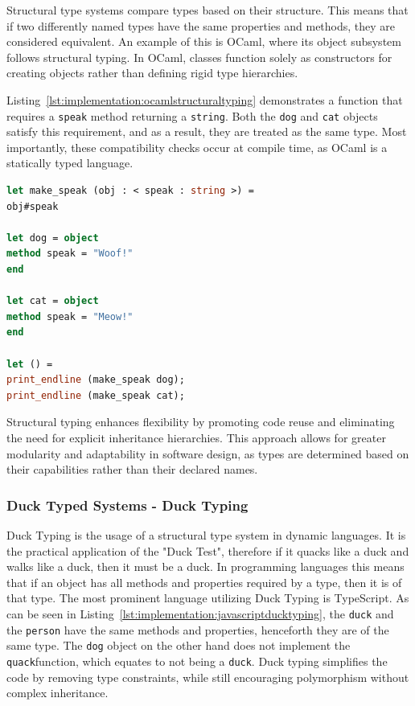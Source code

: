 Structural type systems compare types based on their structure. This means that if two differently named types have the same properties and methods, they are considered equivalent. An example of this is OCaml, where its object subsystem follows structural typing. In OCaml, classes function solely as constructors for creating objects rather than defining rigid type hierarchies.

Listing~\ref{lst:implementation:ocamlstructuraltyping} demonstrates a function that requires a \lstinline|speak| method returning a \lstinline|string|. Both the \lstinline|dog| and \lstinline|cat| objects satisfy this requirement, and as a result, they are treated as the same type. Most importantly, these compatibility checks occur at compile time, as OCaml is a statically typed language.

\begin{lstlisting}[language=OCaml,caption=Example of structural typing in Ocaml,label=lst:implementation:ocamlstructuraltyping]
let make_speak (obj : < speak : string >) =
obj#speak

let dog = object
method speak = "Woof!"
end

let cat = object
method speak = "Meow!"
end

let () =
print_endline (make_speak dog);
print_endline (make_speak cat);
\end{lstlisting}

Structural typing enhances flexibility by promoting code reuse and eliminating the need for explicit inheritance hierarchies. This approach allows for greater modularity and adaptability in software design, as types are determined based on their capabilities rather than their declared names.

\subsubsection{Duck Typed Systems - Duck Typing}

Duck Typing is the usage of a structural type system in dynamic languages. It is the practical application of the "Duck Test", therefore if it quacks like a duck and walks like a duck, then it must be a duck. In programming languages this means that if an object has all methods and properties required by a type, then it is of that type. The most prominent language utilizing Duck Typing is TypeScript. As can be seen in Listing~\ref{lst:implementation:javascriptducktyping}, the \lstinline|duck| and the \lstinline|person| have the same methods and properties, henceforth they are of the same type. The \lstinline|dog| object on the other hand does not implement the \lstinline|quack|function, which equates to not being a \lstinline|duck|. Duck typing simplifies the code by removing type constraints, while still encouraging polymorphism without complex inheritance.

